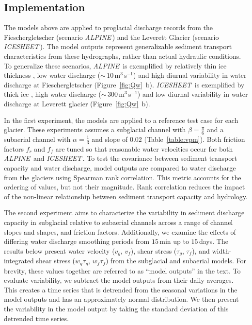 \documentclass[tc, manuscript]{copernicus}
\newcommand{\alpine}{\textit{ALPINE}\,}
\newcommand{\icesheet}{\textit{ICESHEET}\,}
\begin{document}
\FloatBarrier
\subsection{Implementation}
\label{sect:imp}

The models above are applied to proglacial discharge records from the Fieschergletscher (scenario \alpine{}) and the Leverett Glacier (scenario \icesheet{}).
The model outputs represent generalizable sediment transport characteristics from these hydrographs, rather than actual hydraulic conditions.
To generalize these scenarios, \alpine{}  is exemplified by relatively thin ice thickness \citep[$h_{ice}$= $225$\,\unit{m}][]{grab2021}, low water discharge ($\sim\,10$\,\unit{m}$^3$\,\unit{s}$^{-1}$) and high diurnal variability in water discharge at Fieschergletscher (Figure~\ref{fig:Qw}\, b).
\icesheet{}  is exemplified by thick ice  \citep[$h_{ice}$= $700$\,\unit{m}; ][]{morlighem2017}, high water discharge ($\sim\,300$\,\unit{m}$^3$\,\unit{s}$^{-1}$)  and low diurnal variability in water discharge at Leverett glacier (Figure~\ref{fig:Qw}\, b).

In the first experiment, the models are applied to a reference test case for each glacier.
These experiments assumes  a subglacial channel with $\beta=\frac{\pi}{6}$ and a subaerial channel with $\alpha = \frac{1}{3}$ and slope of $0.02$ (Table~\ref{table:vpm}).
Both friction factors $f_r$ and $f_f$ are tuned so that reasonable water velocities \citep[$\sim\,1- 2\,$\unit{m}\,\unit{s}$^{-1}$][]{werder2010b,chandler2013} occur for both \alpine{} and \icesheet{}.
To test the covariance between sediment transport capacity and water discharge, model outputs are compared to water discharge from the glaciers using Spearman rank correlation.
This metric accounts for the ordering of values, but not their magnitude.
Rank correlation reduces the impact of the non-linear relationship between sediment transport capacity and hydrology.

The second experiment aims to characterize the variability in sediment discharge capacity in subglacial relative to subaerial channels across a range of channel slopes and shapes, and friction factors.
Additionally, we examine the effects of differing water discharge smoothing periods from $15$\,\unit{min} up to $15$\,\unit{days}.
The results below present water velocity ($v_g$, $v_f$), shear stress ($\tau_g$, $\tau_f$), and width-integrated shear stress ($w_g\tau_g$, $w_f\tau_f$) from the subglacial and subaerial models.
For brevity, these values together are referred to as ``model outputs'' in the text.
To evaluate variability, we subtract the model outputs from their daily averages. 
This creates a time series that is detrended from the seasonal variations in the model outputs and has an approximately normal distribution.
We then present the variability in the model output by taking the standard deviation of this detrended time series.
\end{document}
